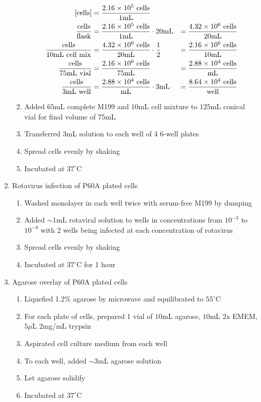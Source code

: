 \begin{enumerate}
\begin{enumerate}
				\begin{align*}
				\text{[cells]} &= \frac{2.16\times 10^{5}\text{ cells}}{1\text{mL}} \\
				\frac{\text{cells}}{\text{flask}} &= \frac{2.16\times 10^{5}\text{ cells}}{1\text{mL}} \cdot 20\text{mL} &= \frac{4.32\times 10^{6}\text{ cells}}{20\text{mL}}\\
				\frac{\text{cells}}{10\text{mL cell mix}} &= \frac{4.32\times 10^{6}\text{ cells}}{20\text{mL}}\cdot \frac{1}{2} &= \frac{2.16\times 10^{6}\text{ cells}}{10\text{mL}}\\
				\frac{\text{cells}}{75\text{mL vial}} &= \frac{2.16\times 10^{6}\text{ cells}}{75\text{mL}} &= \frac{2.88\times 10^{4}\text{ cells}}{\text{mL}}\\
				\frac{\text{cells}}{3\text{mL well}} &= \frac{2.88\times 10^{4}\text{ cells}}{\text{mL}} \cdot 3\text{mL} &= \frac{8.64\times 10^{4}\text{ cells}}{\text{well}}\\
				\end{align*}
			\item Added $65$mL complete M199 and $10$mL cell mixture to $125$mL conical vial for final volume of $75$mL
			\item Transferred $3$mL solution to each well of 4 6-well plates
			\item Spread cells evenly by shaking
			\item Incubated at $37^{\circ}$C
		\end{enumerate}
	\item Rotavirus infection of P60A plated cells
		\begin{enumerate}
			\item Washed monolayer in each well twice with serum-free M199 by dumping
			\item Added $\sim1$mL rotaviral solution to wells in concentrations from $10^{-3}$ to $10^{-8}$ with 2 wells being infected at each concentration of rotavirus
			\item Spread cells evenly by shaking
			\item Incubated at $37^{\circ}$C for 1 hour
		\end{enumerate}
	\item Agarose overlay of P60A plated cells
		\begin{enumerate}
			\item Liquefied 1.2\% agarose by microwave and equilibrated to $55^{\circ}$C
			\item For each plate of cells, prepared 1 vial of $10$mL agarose, $10$mL 2x EMEM, $5\mu$L $2$mg/mL trypsin
			\item Aspirated cell culture medium from each well
			\item To each well, added $\sim3$mL agarose solution
			\item Let agarose solidify
			\item Incubated at $37^{\circ}$C
		\end{enumerate}
\end{enumerate}

